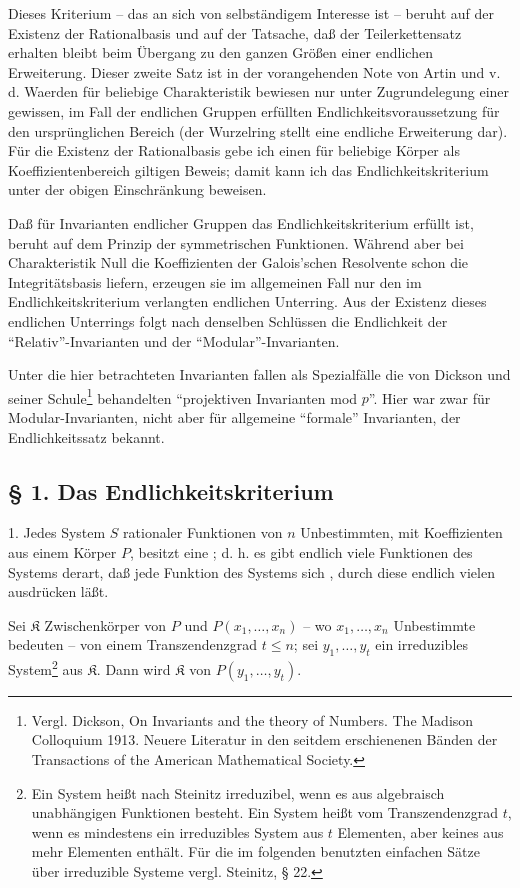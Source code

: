 Dieses Kriterium -- das an sich von selbständigem Interesse ist -- beruht auf der Existenz der Rationalbasis und auf der Tatsache, daß der Teilerkettensatz erhalten bleibt beim Übergang zu den ganzen Größen einer endlichen Erweiterung. Dieser zweite Satz ist in der vorangehenden Note von Artin und v. d. Waerden für beliebige Charakteristik bewiesen nur unter Zugrundelegung einer gewissen, im Fall der endlichen Gruppen erfüllten Endlichkeitsvoraussetzung für den ursprünglichen Bereich (der Wurzelring stellt eine endliche Erweiterung dar). Für die Existenz der Rationalbasis gebe ich einen für beliebige Körper als Koeffizientenbereich giltigen Beweis; damit kann ich das Endlichkeitskriterium unter der obigen Einschränkung beweisen.

Daß für Invarianten endlicher Gruppen das Endlichkeitskriterium erfüllt ist, beruht auf dem Prinzip der symmetrischen Funktionen. Während aber bei Charakteristik Null die Koeffizienten der Galois'schen Resolvente schon die Integritätsbasis liefern, erzeugen sie im allgemeinen Fall nur den im Endlichkeitskriterium verlangten endlichen Unterring. Aus der Existenz dieses endlichen Unterrings folgt nach denselben Schlüssen die Endlichkeit der ``Relativ''-Invarianten und der ``Modular''-Invarianten.

Unter die hier betrachteten Invarianten fallen als Spezialfälle die von Dickson und seiner Schule\footnote{Vergl. Dickson, On Invariants and the theory of Numbers. The Madison Colloquium 1913. Neuere Literatur in den seitdem erschienenen Bänden der Transactions of the American Mathematical Society.} behandelten ``projektiven Invarianten mod $p$''. Hier war zwar für Modular-Invarianten, nicht aber für allgemeine ``formale'' Invarianten, der Endlichkeitssatz bekannt.

\subsection*{§ 1. Das Endlichkeitskriterium}

1.  Jedes System $S$ rationaler Funktionen von $n$ Unbestimmten, mit Koeffizienten aus einem Körper $P$, besitzt eine ; d. h. es gibt endlich viele Funktionen des Systems derart, daß jede Funktion des Systems sich , durch diese endlich vielen ausdrücken läßt.

 Sei $\mathfrak K$ Zwischenkörper von $P$ und $P(x_1,\ldots,x_n)$ -- wo $x_1,\ldots,x_n$ Unbestimmte bedeuten -- von einem Transzendenzgrad $t\leq n$; sei $y_1,\ldots,y_t$ ein irreduzibles System\footnote{Ein System heißt nach Steinitz irreduzibel, wenn es aus algebraisch unabhängigen Funktionen besteht. Ein System heißt vom Transzendenzgrad $t$, wenn es mindestens ein irreduzibles System aus $t$ Elementen, aber keines aus mehr Elementen enthält. Für die im folgenden benutzten einfachen Sätze über irreduzible Systeme vergl. Steinitz, § 22.} aus $\mathfrak K$. Dann wird $\mathfrak K$  von $P(y_1,\ldots,y_t)$.


